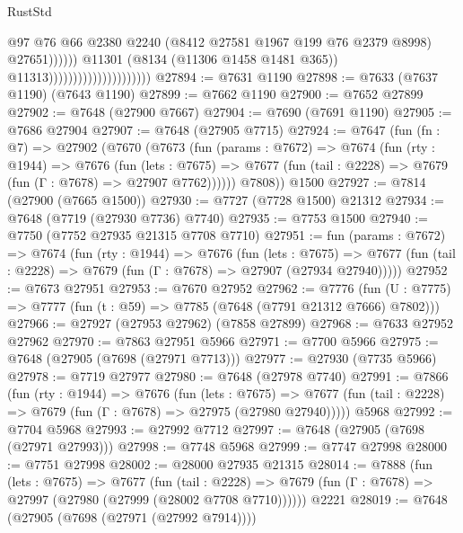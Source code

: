 \begin{lexlean}{RustStd}
\begin{coremodule}
                                                          @97
                                                          @76
                                                          @66
                                                          @2380
                                                          @2240
                                                          (@8412 @27581 @1967 @199 @76 @2379 @8998)
                                                          @27651))))))
                                              @11301
                                              (@8134 (@11306 @1458 @1481 @365))
                                              @11313)))))))))))))))))))))
@27894 := @7631 @1190
@27898 := @7633 (@7637 @1190) (@7643 @1190)
@27899 := @7662 @1190
@27900 := @7652 @27899
@27902 := @7648 (@27900 @7667)
@27904 := @7690 (@7691 @1190)
@27905 := @7686 @27904
@27907 := @7648 (@27905 @7715)
@27924 := @7647
    (fun (fn : @7) =>
    @27902
      (@7670
        (@7673
          (fun (params : @7672) =>
          @7674
            (fun (rty : @1944) =>
            @7676
              (fun (lets : @7675) =>
              @7677 (fun (tail : @2228) => @7679 (fun (Γ : @7678) => @27907 @7762))))))
        @7808))
    @1500
@27927 := @7814 (@27900 (@7665 @1500))
@27930 := @7727 (@7728 @1500) @21312
@27934 := @7648 (@7719 (@27930 @7736) @7740)
@27935 := @7753 @1500
@27940 := @7750 (@7752 @27935 @21315 @7708 @7710)
@27951 := fun (params : @7672) =>
  @7674
    (fun (rty : @1944) =>
    @7676
      (fun (lets : @7675) =>
      @7677 (fun (tail : @2228) => @7679 (fun (Γ : @7678) => @27907 (@27934 @27940)))))
@27952 := @7673 @27951
@27953 := @7670 @27952
@27962 := @7776
    (fun (U : @7775) => @7777 (fun (t : @59) => @7785 (@7648 (@7791 @21312 @7666) @7802)))
@27966 := @27927 (@27953 @27962) (@7858 @27899)
@27968 := @7633 @27952 @27962
@27970 := @7863 @27951 @5966
@27971 := @7700 @5966
@27975 := @7648 (@27905 (@7698 (@27971 @7713)))
@27977 := @27930 (@7735 @5966)
@27978 := @7719 @27977
@27980 := @7648 (@27978 @7740)
@27991 := @7866
    (fun (rty : @1944) =>
    @7676
      (fun (lets : @7675) =>
      @7677 (fun (tail : @2228) => @7679 (fun (Γ : @7678) => @27975 (@27980 @27940)))))
    @5968
@27992 := @7704 @5968
@27993 := @27992 @7712
@27997 := @7648 (@27905 (@7698 (@27971 @27993)))
@27998 := @7748 @5968
@27999 := @7747 @27998
@28000 := @7751 @27998
@28002 := @28000 @27935 @21315
@28014 := @7888
    (fun (lets : @7675) =>
    @7677
      (fun (tail : @2228) =>
      @7679 (fun (Γ : @7678) => @27997 (@27980 (@27999 (@28002 @7708 @7710))))))
    @2221
@28019 := @7648 (@27905 (@7698 (@27971 (@27992 @7914))))

\end{coremodule}
\end{lexlean}
